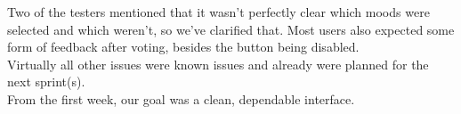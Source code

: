 Two of the testers mentioned that it wasn't perfectly clear which moods were selected and which weren't, so we've clarified that.
Most users also expected some form of feedback after voting, besides the button being disabled.\\

Virtually all other issues were known issues and already were planned for the next sprint(s).\\

From the first week, our goal was a clean, dependable interface.